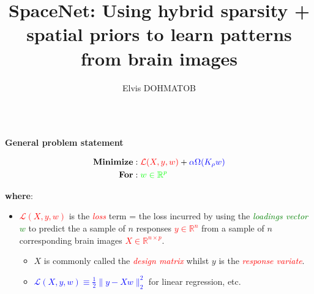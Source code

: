 \documentclass[french]{STIC_poster}
\title{SpaceNet: Using hybrid sparsity + spatial priors to learn patterns from brain images}			%
\author{Elvis DOHMATOB}						%
\begin{document}
	\begin{frame}[t]
		\begin{columns}[t]
			\hfill
			\begin{column}{.48\linewidth}
				\begin{sxbox}[\textwidth]{\textbf{General problem statement}}
                                  \begin{notitlebox}[\textwidth]
                                    \begin{equation}
                                      \begin{split}
                                        \textbf{Minimize} &: \textcolor{red}{\mathcal{L}(X,y,w)} + \textcolor{blue}{\alpha \Omega(K_{\rho}w)}\\
                                        \textbf{For} &: \textcolor{green}{w\in\mathbb{R}^p}
                                        \label{eq:opt_pb}
                                      \end{split}
                                    \end{equation}
                                  \end{notitlebox}
                                  \textbf{where}:
                                  \begin{itemize}
                                    \item \textcolor{red}{$\mathcal{L}(X,y,w)$} is the \textcolor{red}{\textit{loss}} term = the loss incurred by using the
                                      \textcolor{green}{\textit{loadings vector} $w$} to predict the a sample of $n$
                                      responses \textcolor{red}{$y\in\mathbb{R}^n$} from a sample of $n$ corresponding brain images \textcolor{red}{$X\in\mathbb{R}^{n \times p}$}.
                                      \begin{itemize}
                                        \item $X$ is commonly called the \textcolor{red}{\textit{design matrix}} whilst $y$ is the \textcolor{red}{\textit{response variate}}.
                                        \item \textcolor{blue}{$\mathcal{L}(X,y,w) \equiv \frac{1}{2}\|y-Xw\|_2^2$} for linear regression, etc.

\end{itemize}
\end{itemize}
\end{sxbox}
\end{column}
\end{columns}
\end{frame}
\end{document}
